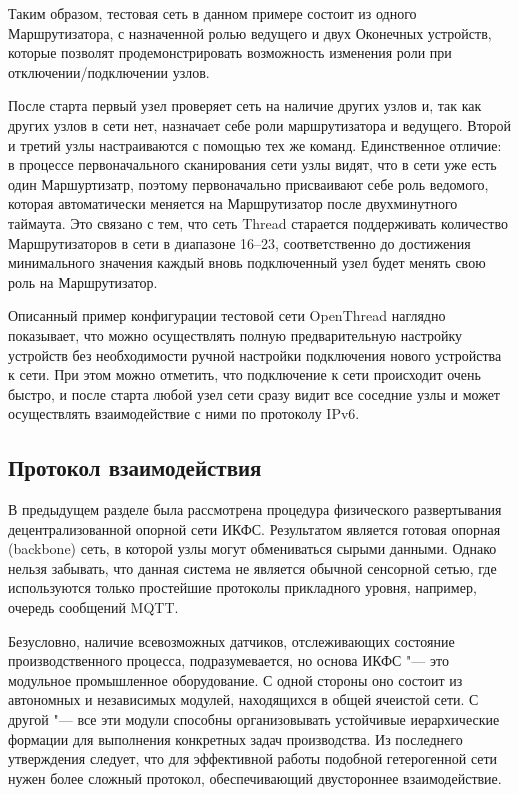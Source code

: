 Таким образом, тестовая сеть в данном примере состоит из одного Маршрутизатора, с назначенной ролью ведущего и двух Оконечных устройств, которые позволят продемонстрировать возможность изменения роли при отключении/подключении узлов.

После старта первый узел проверяет сеть на наличие других узлов и, так как других узлов в сети нет, назначает себе роли маршрутизатора и ведущего. Второй и третий узлы настраиваются с помощью тех же команд. Единственное отличие: в процессе первоначального сканирования сети узлы видят, что в сети уже есть один Маршуртизатр, поэтому первоначально присваивают себе роль ведомого, которая автоматически меняется на Маршрутизатор после двухминутного таймаута. Это связано с тем, что сеть Thread старается поддерживать количество Маршрутизаторов в сети в диапазоне 16--23, соответственно до достижения минимального значения каждый вновь подключенный узел будет менять свою роль на Маршрутизатор.

Описанный пример конфигурации тестовой сети OpenThread наглядно показывает, что можно осуществлять полную предварительную настройку устройств без необходимости ручной настройки подключения нового устройства к сети. При этом можно отметить, что подключение к сети происходит очень быстро, и после старта любой узел сети сразу видит все соседние узлы и может осуществлять взаимодействие с ними по протоколу IPv6.

\subsection{Протокол взаимодействия}

В предыдущем разделе была рассмотрена процедура физического развертывания децентрализованной опорной сети ИКФС. Результатом является готовая опорная  (backbone) сеть, в которой узлы могут обмениваться сырыми данными. Однако нельзя забывать, что данная система не является обычной сенсорной сетью, где используются только простейшие протоколы прикладного уровня, например, очередь сообщений MQTT.

Безусловно, наличие всевозможных датчиков, отслеживающих состояние производственного процесса, подразумевается, но основа ИКФС "--- это модульное промышленное оборудование. С одной стороны оно состоит из автономных и независимых модулей, находящихся в общей ячеистой сети. С другой "--- все эти модули способны организовывать устойчивые иерархические формации для выполнения конкретных задач производства. Из последнего утверждения следует, что для эффективной работы подобной гетерогенной сети нужен более сложный протокол, обеспечивающий двустороннее взаимодействие.


